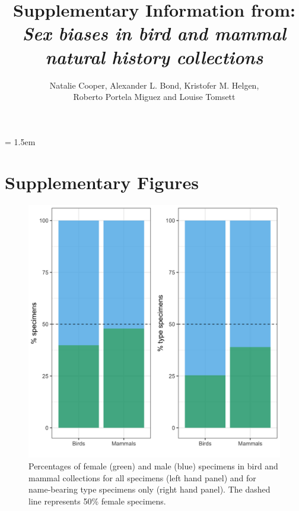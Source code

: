\documentclass[a4paper, 12pt]{article}
\title{Supplementary Information from: \textit{Sex biases in bird and mammal natural history collections}}
\author{Natalie Cooper, 
  Alexander L. Bond,
  Kristofer M. Helgen,\\
  Roberto Portela Miguez and
  Louise Tomsett}
\date{}
\begin{document}
\maketitle

\parindent = 1.5em
\addtolength{\parskip}{.3em}


\section{Supplementary Figures} 

\begin{figure}[H]
 \centering
  \includegraphics[width = \linewidth]{figures/types-all.png}
  \caption{Percentages of female (green) and male (blue) specimens in bird and mammal collections for all specimens (left hand panel) and for name-bearing type specimens only (right hand panel). 
  The dashed line represents 50\% female specimens.}
  \label{fig-types}
\end{figure}
\end{document}
